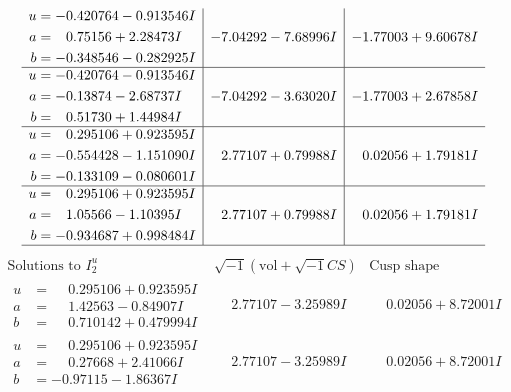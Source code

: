 \documentclass[1p]{elsarticle_modified}
\theoremstyle{definition}
\newcommand{\I}{\sqrt{-1}}
\begin{document}
$$\begin{array}{c|c|c}
\begin{aligned}
u &= -0.420764 - 0.913546 I \\
a &= \phantom{-}0.75156 + 2.28473 I \\
b &= -0.348546 - 0.282925 I\end{aligned}
 & -7.04292 - 7.68996 I & -1.77003 + 9.60678 I \\ \hline\begin{aligned}
u &= -0.420764 - 0.913546 I \\
a &= -0.13874 - 2.68737 I \\
b &= \phantom{-}0.51730 + 1.44984 I\end{aligned}
 & -7.04292 - 3.63020 I & -1.77003 + 2.67858 I \\ \hline\begin{aligned}
u &= \phantom{-}0.295106 + 0.923595 I \\
a &= -0.554428 - 1.151090 I \\
b &= -0.133109 - 0.080601 I\end{aligned}
 & \phantom{-}2.77107 + 0.79988 I & \phantom{-}0.02056 + 1.79181 I \\ \hline\begin{aligned}
u &= \phantom{-}0.295106 + 0.923595 I \\
a &= \phantom{-}1.05566 - 1.10395 I \\
b &= -0.934687 + 0.998484 I\end{aligned}
 & \phantom{-}2.77107 + 0.79988 I & \phantom{-}0.02056 + 1.79181 I\\
 \hline 
 \end{array}$$\newpage$$\begin{array}{c|c|c}  
\text{Solutions to }I^u_{2}& \I (\text{vol} + \sqrt{-1}CS) & \text{Cusp shape}\\
 \hline 
\begin{aligned}
u &= \phantom{-}0.295106 + 0.923595 I \\
a &= \phantom{-}1.42563 - 0.84907 I \\
b &= \phantom{-}0.710142 + 0.479994 I\end{aligned}
 & \phantom{-}2.77107 - 3.25989 I & \phantom{-}0.02056 + 8.72001 I \\ \hline\begin{aligned}
u &= \phantom{-}0.295106 + 0.923595 I \\
a &= \phantom{-}0.27668 + 2.41066 I \\
b &= -0.97115 - 1.86367 I\end{aligned}
 & \phantom{-}2.77107 - 3.25989 I & \phantom{-}0.02056 + 8.72001 I \\ \hline\begin{aligned}

\end{aligned}
\end{array}$$
\end{document}
